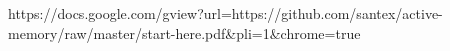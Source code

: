 https://docs.google.com/gview?url=https://github.com/santex/active-memory/raw/master/start-here.pdf&pli=1&chrome=true
